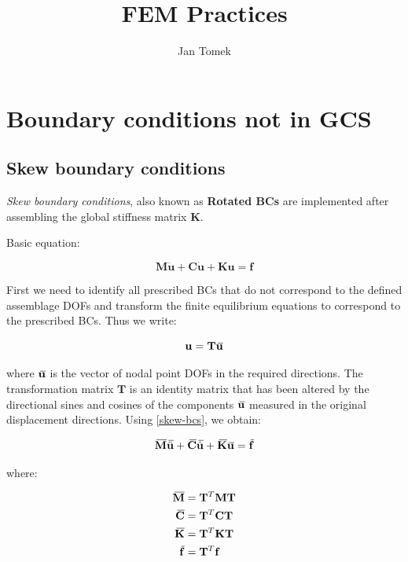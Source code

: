 \documentclass[10pt,b5paper,titlepage]{book}
\author{Jan Tomek}
\title{\bf FEM Practices}
\newcommand{\m}{\mathbf}
\newcommand{\closure}[2][3]{%
{}\mkern#1mu\overline{\mkern-#1mu#2}}
\newenvironment{eqarray}
{
    \begin{eqnarray}
        \begin{aligned}
}
{
        \end{aligned}
    \end{eqnarray}
}
\begin{document}
\maketitle

\tableofcontents


\newpage
\chapter{Boundary conditions not in GCS}

\section{Skew boundary conditions}
\textit{Skew boundary conditions}, also known as \textbf{Rotated BCs} are implemented
after assembling the global stiffness matrix $ \m{K} $.

Basic equation:

\begin{equation}
    \m{M} \ddot{\m{u}} + \m{C} \dot{\m{u}} + \m{K} \m{u}
    = \m{f}
\end{equation}

First we need to identify all prescribed BCs that do not correspond to the
defined assemblage DOFs and transform the finite equilibrium equations to
correspond to the prescribed BCs. Thus we write:

\begin{equation}\label{skew-bcs}
    \m{u} = \m{T} \closure{\m{u}}
\end{equation}

where $ \closure{\m{u}} $ is the vector of nodal point DOFs in the required
directions. The transformation matrix $ \m{T} $ is an identity matrix
that has been altered by the directional sines and cosines of the components
$ \closure{\m{u}} $ measured in the original displacement directions.
Using \eqref{skew-bcs}, we obtain:

\begin{equation}
    \closure{\m{M}} \closure{\ddot{\m{u}}}
    + \closure{\m{C}} \closure{\dot{\m{u}}}
    + \closure{\m{K}} \closure{\m{u}}
    = \closure{\m{f}}
\end{equation}

where:

\begin{eqarray}\label{skew-eq-of-motion}
    \closure{\m{M}} & = \m{T}^T \m{M} \m{T} \\
    \closure{\m{C}} & = \m{T}^T \m{C} \m{T} \\
    \closure{\m{K}} & = \m{T}^T \m{K} \m{T} \\
    \closure{\m{f}} & = \m{T}^T \m{f}
\end{eqarray}
\end{document}
